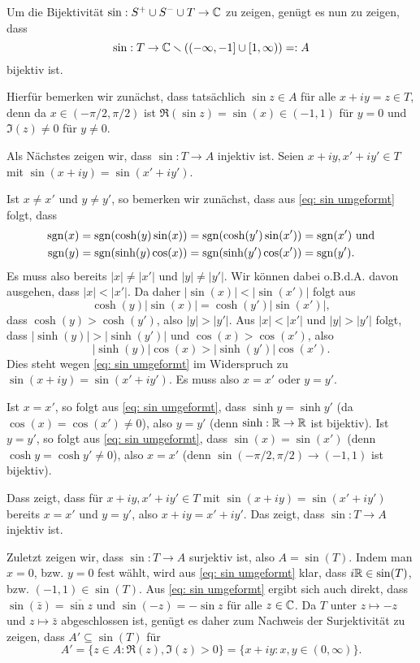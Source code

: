 \documentclass[a4paper,10pt]{article}
\begin{document}
Um die Bijektivität $\sin : S^+ \cup S^- \cup T \to \mathbb{C}$ zu zeigen, genügt es nun zu zeigen, dass
\[
 \sin : T \to \mathbb{C} \smallsetminus ( (-\infty,-1] \cup [1,\infty)) =: A
\]
bijektiv ist.

Hierfür bemerken wir zunächst, dass tatsächlich $\sin z \in A$ für alle $x+iy = z \in T$, denn da $x \in (-\pi/2, \pi/2)$ ist $\Re(\sin z) = \sin(x) \in (-1,1)$ für $y = 0$ und $\Im(z) \neq 0$ für $y \neq 0$.

Als Nächstes zeigen wir, dass $\sin : T \to A$ injektiv ist. Seien $x+iy, x'+iy' \in T$ mit $\sin(x+iy) = \sin(x'+iy')$.

Ist $x \neq x'$ und $y \neq y'$, so bemerken wir zunächst, dass aus \eqref{eq: sin umgeformt} folgt, dass
\begin{align*}
 \operatorname{sgn}(x) = \operatorname{sgn}(\cosh(y)\sin(x)) &= \operatorname{sgn}(\cosh(y')\sin(x')) = \operatorname{sgn}(x') \text{ und} \\
 \operatorname{sgn}(y) = \operatorname{sgn}(\sinh(y)\cos(x)) &= \operatorname{sgn}(\sinh(y')\cos(x')) = \operatorname{sgn}(y').
\end{align*}
Es muss also bereits $|x| \neq |x'|$ und $|y| \neq |y'|$. Wir können dabei o.B.d.A. davon ausgehen, dass $|x| < |x'|$. Da daher $|\sin(x)| < |\sin(x')|$ folgt aus
\[
 \cosh(y)|\sin(x)| = \cosh(y')|\sin(x')|,
\]
dass $\cosh(y) > \cosh(y')$, also $|y| > |y'|$. Aus $|x| < |x'|$ und $|y| > |y'|$ folgt, dass $|\sinh(y)| > |\sinh(y')|$ und $\cos(x) > \cos(x')$, also
\[
 |\sinh(y)|\cos(x) > |\sinh(y')|\cos(x').
\]
Dies steht wegen \eqref{eq: sin umgeformt} im Widerspruch zu $\sin(x+iy)=\sin(x'+iy')$. Es muss also $x = x'$ oder $y = y'$.

Ist $x = x'$, so folgt aus \eqref{eq: sin umgeformt}, dass $\sinh y  = \sinh y'$ (da $\cos(x) = \cos(x') \neq 0$), also $y = y'$ (denn $\sinh : \mathbb{R} \to \mathbb{R}$ ist bijektiv). Ist $y = y'$, so folgt aus \eqref{eq: sin umgeformt}, dass $\sin(x) = \sin(x')$ (denn $\cosh y = \cosh y' \neq 0$), also $x = x'$ (denn $\sin (-\pi/2,\pi/2) \to (-1,1)$ ist bijektiv).

Dass zeigt, dass für $x+iy, x'+iy' \in T$ mit $\sin(x+iy) = \sin(x'+iy')$ bereits $x=x'$ und $y=y'$, also $x+iy = x'+iy'$. Das zeigt, dass $\sin : T \to A$ injektiv ist.

Zuletzt zeigen wir, dass $\sin : T \to A$ surjektiv ist, also $A = \sin(T)$. Indem man $x=0$, bzw. $y=0$ fest wählt, wird aus \eqref{eq: sin umgeformt} klar, dass $i\mathbb{R} \in \sin(T)$, bzw. $(-1,1) \in \sin(T)$. Aus \eqref{eq: sin umgeformt} ergibt sich auch direkt, dass $\sin(\bar{z}) = \overline{\sin z}$ und $\sin(-z) = -\sin z$ für alle $z \in \mathbb{C}$. Da $T$ unter $z \mapsto -z$ und $z \mapsto \bar{z}$ abgeschlossen ist, genügt es daher zum Nachweis der Surjektivität zu zeigen, dass $A' \subseteq \sin(T)$ für
\[
 A' = \{z \in A : \Re(z), \Im(z) > 0\} = \{x+iy : x,y \in (0,\infty)\}.
\]
\end{document}
